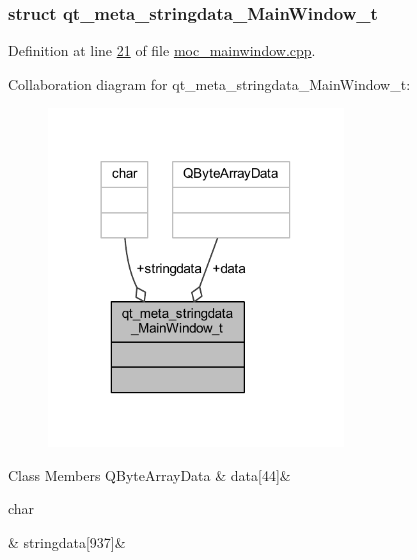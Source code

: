 \subsubsection{struct qt\+\_\+meta\+\_\+stringdata\+\_\+\+Main\+Window\+\_\+t}


Definition at line \hyperlink{a00066_source_l00021}{21} of file \hyperlink{a00066_source}{moc\+\_\+mainwindow.\+cpp}.



Collaboration diagram for qt\+\_\+meta\+\_\+stringdata\+\_\+\+Main\+Window\+\_\+t\+:
\nopagebreak
\begin{figure}[H]
\begin{center}
\leavevmode
\includegraphics[width=222pt]{d6/d7f/a00287}
\end{center}
\end{figure}
\begin{DoxyFields}{Class Members}
\hypertarget{a00066_a3d0c7851e40263cf43b0979ebc8eed83}{Q\+Byte\+Array\+Data}\label{a00066_a3d0c7851e40263cf43b0979ebc8eed83}
&
data\mbox{[}44\mbox{]}&
\\
\hline

\hypertarget{a00066_aa581d4bebf76b40e9469596766315411}{char}\label{a00066_aa581d4bebf76b40e9469596766315411}
&
stringdata\mbox{[}937\mbox{]}&
\\
\hline

\end{DoxyFields}



